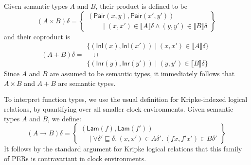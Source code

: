 \documentclass[natbib]{sigplanconf}
\newcommand{\sepbar}{\mathrel|}
\newcommand{\sem}[1]{\llbracket #1 \rrbracket}
\newcommand{\semCons}[1]{\mathsf{#1}}
\begin{document}
Given semantic types $A$ and $B$, their product is defined to be
\begin{displaymath}
  (A \times B)\delta =
  \left\{
    \begin{array}{l}
      (\semCons{Pair}(x,y),\semCons{Pair}(x',y')) \\
      \quad\quad\sepbar (x,x') \in \sem{A}\delta \land (y,y') \in \sem{B}\delta 
    \end{array}
  \right\}
\end{displaymath}
and their coproduct is
\begin{displaymath}
  (A + B)\delta =
  \begin{array}{l}
    \{ (\semCons{Inl}(x), \semCons{Inl}(x')) \mathrel| (x,x') \in \sem{A}\delta \} \\
    \quad \cup \\
    \{ (\semCons{Inr}(y),\semCons{Inr}(y')) \mathrel| (y,y') \in \sem{B}\delta \}
  \end{array}
\end{displaymath}
Since $A$ and $B$ are assumed to be semantic types, it immediately
follows that $A \times B$ and $A + B$ are semantic types.

To interpret function types, we use the usual definition for
Kripke-indexed logical relations, by quantifying over all smaller clock
environments. Given semantic types $A$ and $B$, we define:
\begin{displaymath}
  (A \to B)\delta = \left\{
    \begin{array}{l}
      (\semCons{Lam}(f),\semCons{Lam}(f')) \\
      \quad \sepbar \forall \delta' \sqsubseteq \delta, (x,x') \in A\delta'.\ (fx,f'x') \in B\delta'
    \end{array}
  \right\}
\end{displaymath}
It follows by the standard argument for Kripke logical relations that
this family of PERs is contravariant in clock environments.
\end{document}
